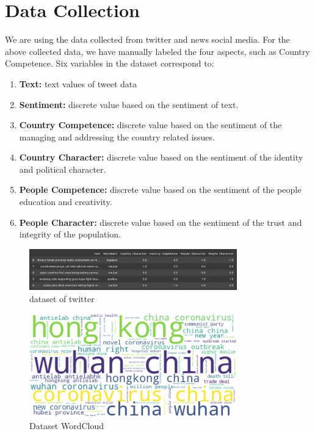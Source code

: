 \documentclass[conference]{IEEEtran}
\begin{document}
\section{Data Collection}

We are using the data collected from twitter and news social media. For the above collected data, we have manually labeled the four aspects, such as Country Competence. Six variables in the dataset correspond to:

\begin{enumerate}

\item \textbf{Text:} text values of tweet data 

\item \textbf{Sentiment: } discrete value based on the sentiment of text.

\item \textbf{Country Competence:} discrete value based on the sentiment of the managing and addressing the country related issues.

\item \textbf{Country Character:} discrete value based on the sentiment of the identity and political character.

\item \textbf{People Competence:} discrete value based on the sentiment of the people education and creativity.

\item \textbf{People Character:} discrete value based on the sentiment of the trust and integrity of the population.

\end{enumerate}

\begin{figure}[h]
\centering
 \includegraphics[width=9cm]{dataset}
 \caption{dataset of twitter}
 \end{figure}
 
\begin{figure}[h]
\centering
 \includegraphics[width=9cm]{WordCloud}
 \caption{Dataset WordCloud}
 \end{figure}
\end{document}

